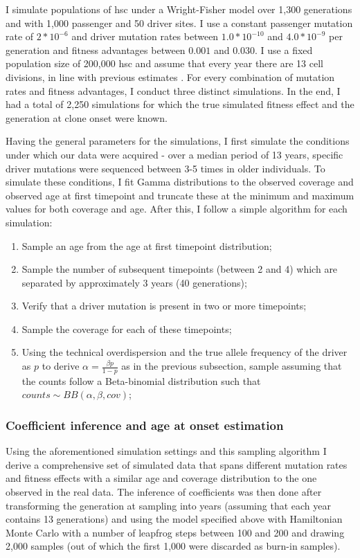 I simulate populations of \ac{hsc} under a Wright-Fisher model \cite{Beerenwinkel_undated-up} over 1,300 generations and with 1,000 passenger and 50 driver sites. I use a constant passenger mutation rate of $2*10^{-6}$ and driver mutation rates between $1.0*10^{-10}$ and $4.0*10^{-9}$ per generation and fitness advantages between $0.001$ and $0.030$. I use a fixed population size of 200,000 \ac{hsc} and assume that every year there are 13 cell divisions, in line with previous estimates \cite{Lee-Six2018-lp,Watson2020-pz}. For every combination of mutation rates and fitness advantages, I conduct three distinct simulations. In the end, I had a total of 2,250 simulations for which the true simulated fitness effect and the generation at clone onset were known.

Having the general parameters for the simulations, I first simulate the conditions under which our data were acquired - over a median period of 13 years, specific driver mutations were sequenced between 3-5 times in older individuals. To simulate these conditions, I fit Gamma distributions to the observed coverage and observed age at first timepoint and truncate these at the minimum and maximum values for both coverage and age. After this, I follow a simple algorithm for each simulation:

\begin{enumerate}
    \item Sample an age from the age at first timepoint distribution;
    \item Sample the number of subsequent timepoints (between 2 and 4) which are separated by approximately 3 years (40 generations);
    \item Verify that a driver mutation is present in two or more timepoints;
    \item Sample the coverage for each of these timepoints;
    \item Using the technical overdispersion and the true allele frequency of the driver as $p$ to derive $\alpha = \frac{\beta p}{1-p}$ as in the previous subsection, sample assuming that the counts follow a Beta-binomial distribution such that $counts \sim BB(\alpha,\beta,cov)$;
\end{enumerate}

\subsubsection{Coefficient inference and age at onset estimation}

Using the aforementioned simulation settings and this sampling algorithm I derive a comprehensive set of simulated data that spans different mutation rates and fitness effects with a similar age and coverage distribution to the one observed in the real data. The inference of coefficients was then done after transforming the generation at sampling into years (assuming that each year contains 13 generations) and using the model specified above with Hamiltonian Monte Carlo with a number of leapfrog steps between 100 and 200 and drawing 2,000 samples (out of which the first 1,000 were discarded as burn-in samples). 

